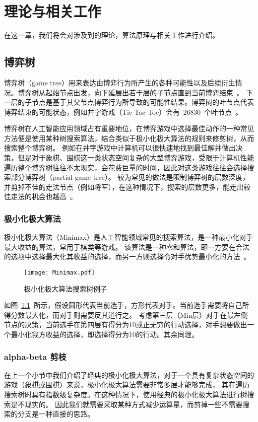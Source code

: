 \chapter{理论与相关工作}
\label{chap:theory}
在这一章，我们将会对涉及到的理论，算法原理与相关工作进行介绍。
\section{博弈树}
博弈树（game tree）用来表达由博弈行为所产生的各种可能性以及后续衍生情况。博弈树从起始节点出发，向下延展出若干层的子节点直到当前博弈结束~\cite{gt}。
下一层的子节点是基于其父节点博弈行为所导致的可能性结果。博弈树的叶节点代表博弈结束的可能状态，例如井字游戏（Tic-Tac-Toe）会有~26830~个叶节点~\cite{NAU1982257,allis1994searching}。


博弈树在人工智能应用领域占有重要地位，在博弈游戏中选择最佳动作的一种常见方法便是使用某种树搜索算法，结合类似于极小化极大算法的规则来修剪树，从而搜索整个博弈树。
例如在井字游戏中计算机可以很快速地找到最佳解并做出决策，但是对于象棋、围棋这一类状态空间复杂的大型博弈游戏，受限于计算机性能遍历整个博弈树往往不太现实，会花费巨量的时间，因此对这类游戏往往会选择搜索部分博弈树（partial game tree）。
较为常见的做法是限制博弈树的层数深度，并剪掉不佳的走法节点（例如将军），在这种情况下，搜索的层数更多，能走出较佳走法的机会也越高~\cite{coin12162}。

\subsection{极小化极大算法}
极小化极大算法（Minimax）是人工智能领域常见的搜索算法，是一种最小化对手最大收益的算法，常用于棋类等游戏。
该算法是一种零和算法，即一方要在合法的选项中选择最大化其收益的选择，而另一方则选择令对手优势最小化的方法~\cite{ctt1r2gkx}。

\begin{figure}[htb]
    \centering
    \texttt{[image: Minimax.pdf]}
    \caption[minimax]{%
      极小化极大算法搜索树例子~\cite{wikiMinimax}%
      }
    \label{fig:minimax}
  \end{figure}

如图~\ref{fig:minimax}~所示，假设圆形代表当前选手，方形代表对手。当前选手需要将自己所得分数最大化，而对手则需要反其道行之。
考虑第三层（Min层）对手在最左侧节点的决策，当前选手在第四层有得分为10或正无穷的行动选择，对手想要做出一个最小化我方收益的选择，即选择得分为10的行动。其余同理。
\subsection{alpha-beta 剪枝}
在上一个小节中我们介绍了经典的极小化极大算法，对于一个具有复杂状态空间的游戏（象棋或围棋）来说，极小化极大算法需要非常多层才能够完成，
其在遍历搜索树时具有指数级复杂度。在这种情况下，使用经典的极小化极大算法进行树搜索是不现实的。
因此我们就需要采取某种方式减少运算量，而剪掉一些不需要搜索的分支是一种直接的思路。

